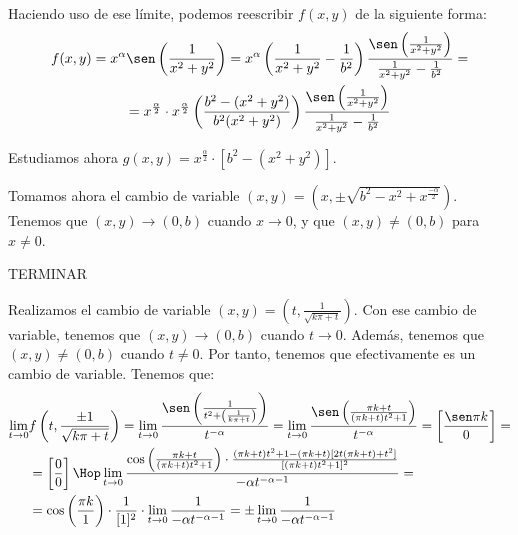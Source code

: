 \begin{ejercicio}
\begin{enumerate}
\begin{enumerate}
            Haciendo uso de ese límite, podemos reescribir $f(x,y)$ de la siguiente forma:
            \begin{multline*}
                f(x,y)=x^\alpha \sen\left(\frac{1}{x^2+y^2}\right)
                = x^\alpha \left(\frac{1}{x^2+y^2} - \frac{1}{b^2}\right) \frac{\sen\left(\frac{1}{x^2+y^2}\right)}{\frac{1}{x^2+y^2} - \frac{1}{b^2}}
                =\\= x^{\frac{\alpha}{2}}\cdot x^{\frac{\alpha}{2}} \left(\frac{b^2-(x^2+y^2)}{b^2(x^2+y^2)}\right) \frac{\sen\left(\frac{1}{x^2+y^2}\right)}{\frac{1}{x^2+y^2} - \frac{1}{b^2}}
            \end{multline*}

            Estudiamos ahora $g(x,y)=x^{\frac{\alpha}{2}}\cdot [b^2-(x^2+y^2)]$.

            Tomamos ahora el cambio de variable $(x,y)=\left(x,\pm \sqrt{b^2-x^2+x^{\frac{-\alpha}{2}}}\right)$. Tenemos que $(x,y)\to (0,b)$ cuando $x\to 0$, y que $(x,y)\neq (0,b)$ para $x\neq 0$.

            TERMINAR %




            

            
            Realizamos el cambio de variable $(x,y)=\left(t,\frac{1}{\sqrt{k\pi + t}}\right)$. Con ese cambio de variable, tenemos que $(x,y)\to (0,b)$ cuando $t\to 0$. Además, tenemos que $(x,y)\neq (0,b)$ cuando $t\neq 0$. Por tanto, tenemos que efectivamente es un cambio de variable. Tenemos que:
            \begin{equation*}\begin{split}
                \lim_{t\to 0}& f\left(t,\frac{\pm 1}{\sqrt{k\pi + t}}\right)
                = \lim_{t\to 0}\frac{\sen \left(\frac{1}{t^2 + \left(\frac{1}{k\pi + t}\right)}\right) }{t^{-\alpha}}
                = \lim_{t\to 0}\frac{\sen \left(\frac{\pi k + t}{(\pi k +t)t^2 + 1}\right) }{t^{-\alpha}}
                = \left[\frac{\sen \pi k}{0}\right] =
                \\&=\left[\frac{0}{0}\right]\Hop
                \lim_{t\to 0}\frac{\cos\left(\frac{\pi k + t}{(\pi k +t)t^2 + 1}\right) \cdot \frac{(\pi k +t)t^2 + 1 -(\pi k + t)[2t(\pi k + t) + t^2]}{[(\pi k +t)t^2 + 1]^2}}{-\alpha t^{-\alpha -1}}
                =\\&= 
                \cos\left(\frac{\pi k}{1}\right) \cdot \frac{1}{[1]^2} \cdot \lim_{t\to 0}
                \frac{1}{-\alpha t^{-\alpha -1}}
                = 
                \pm \lim_{t\to 0}
                \frac{1}{-\alpha t^{-\alpha -1}}
            \end{split}\end{equation*}


\end{enumerate}
\end{enumerate}
\end{ejercicio}
